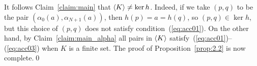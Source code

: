It follows Claim~\ref{claim:main} that 
$\langle K\rangle \neq \ker h$. Indeed, if we take $(p, q)$ to be 
the pair $(\alpha_0(a), \alpha_{N+1}(a))$, then  $h(p) = a = h(q)$, 
so $(p,q) \in \ker h$, but this choice of $(p,q)$ does not satisfy 
condition~(\ref{eq:acc01}). On 
the other hand, by Claim~\ref{claim:main_alpha} all pairs in $\langle K\rangle$ 
satisfy~(\ref{eq:acc01})--(\ref{eq:acc03}) when $K$ is a finite set.   The 
proof of Proposition~\ref{prop:2.2} is now complete.\qed


  




    


